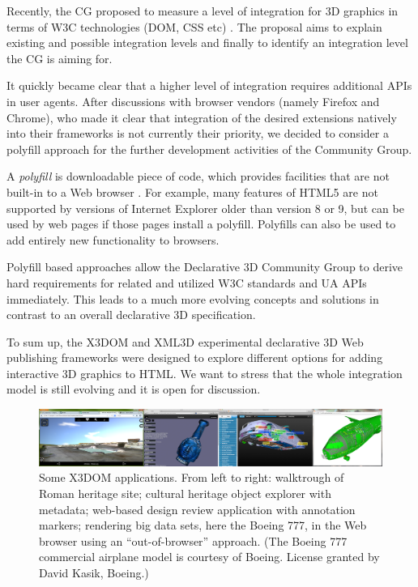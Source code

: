 \documentclass[review]{acmsiggraph}
\begin{document}
Recently, the CG proposed to measure a level of integration for 3D graphics in terms of W3C technologies (DOM, CSS etc) \cite{Dec3D-LevelsOfIntegration}. The proposal aims to explain existing and possible integration levels and finally to identify an integration level the CG is aiming for.

It quickly became clear that a higher level of integration requires additional APIs in user agents. After discussions with browser vendors (namely Firefox and Chrome), who made it clear that integration of the desired extensions natively into their frameworks is not currently their priority, we decided to consider a polyfill approach for the further development activities of the Community Group.

A \textit{polyfill} is downloadable piece of code, which provides facilities that are not built-in to a Web browser \cite{Sharp2010}. For example, many features of HTML5 are not supported by versions of Internet Explorer older than version 8 or 9, but can be used by web pages if those pages install a polyfill. Polyfills can also be used to add entirely new functionality to browsers.

Polyfill based approaches allow the Declarative 3D Community Group to derive hard requirements for related and utilized W3C standards and UA APIs immediately. This leads to a much more evolving concepts and solutions in contrast to an overall declarative 3D specification.

To sum up, the X3DOM and XML3D experimental declarative 3D Web publishing frameworks were designed to explore different options for adding interactive 3D graphics to HTML. We want to stress that the whole integration model is still evolving and it is open for discussion.

\begin{figure}%
  \centering
  \includegraphics[width=\linewidth]{images/x3dom_apps.png}
  \caption{Some X3DOM applications. From left to right: walktrough of Roman heritage site; cultural heritage object explorer with metadata; web-based design review application with annotation markers; rendering big data sets, here the Boeing 777, in the Web browser using an ``out-of-browser'' approach. (The Boeing 777 commercial airplane model is courtesy of Boeing. License granted by David Kasik, Boeing.)}
  \vspace{-0.2cm}
\end{figure}
\end{document}
